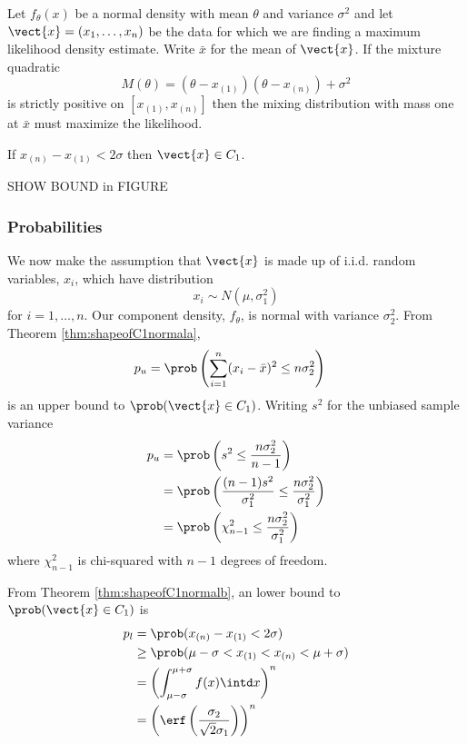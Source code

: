 	\begin{theorem} \label{thm:shapeofC1normalb}
		Let $f_\theta(x)$ be a normal density with mean $\theta$ and variance $\sigma^2$ and let $\vect{x} = (x_1,\dots,x_n)$ be the data for which we are finding a maximum likelihood density estimate. Write $\bar{x}$ for the mean of $\vect{x}$. If the mixture quadratic
		$$M(\theta) = (\theta - x_{(1)})(\theta - x_{(n)}) + \sigma^2$$
		is strictly positive on $[x_{(1)},x_{(n)}]$ then the mixing distribution with mass one at $\bar{x}$ must maximize the likelihood. 
	\end{theorem}
	\begin{corollary}
		If $x_{(n)} - x_{(1)} < 2\sigma$ then $\vect{x} \in C_1$.
	\end{corollary}

	SHOW BOUND in FIGURE

	\subsubsection{Probabilities}

	We now make the assumption that $\vect{x}$ is made up of i.i.d. random variables, $x_i$, which have distribution
	$$x_i \sim N(\mu,\sigma_1^2)$$
	for $i = 1,\dots,n$. Our component density, $f_\theta$, is normal with variance $\sigma_2^2$. From Theorem \ref{thm:shapeofC1normala},
	\begin{align*}
	p_u &= \prob \left( \sum_{i=1}^n (x_i - \bar{x})^2 \leq n \sigma_2^2  \right)
	\end{align*}
	is an upper bound to $\prob(\vect{x} \in C_1)$. Writing $s^2$ for the unbiased sample variance
	\begin{align*}
	p_u 
	&= \prob\left( s^2 \leq \frac{n \sigma_2^2}{n-1}\right)\\
	&= \prob\left( \frac{(n-1)s^2}{\sigma_1^2} \leq \frac{n \sigma_2^2}{\sigma_1^2}\right)\\
	&= \prob\left(\chi_{n-1}^2  \leq \frac{n \sigma_2^2}{\sigma_1^2} \right)
	\end{align*}
	where $\chi_{n-1}^2$ is chi-squared with $n-1$ degrees of freedom.

	From Theorem \ref{thm:shapeofC1normalb}, an lower bound to $\prob(\vect{x} \in C_1)$ is
	\begin{align*}
	p_l &= \prob(x_{(n)} - x_{(1)} < 2\sigma)\\
		&\geq \prob(\mu - \sigma < x_{(1)} < x_{(n)} < \mu + \sigma )\\
		&=  \left(\int_{\mu - \sigma}^{\mu + \sigma} f(x) \intd x \right)^n\\
		&= \left( \erf\left(\frac{\sigma_2}{\sqrt{2}\sigma_1}\right)\right)^n
	\end{align*}





